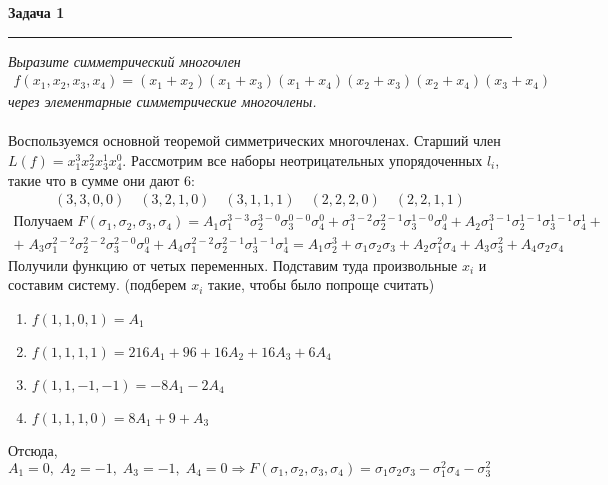 \documentclass[a4paper,11pt]{article}
\begin{document}
\textbf{\large Задача 1}
\medskip\hrule\medskip
\textit{Выразите симметрический многочлен}
\begin{gather*}
f(x_1, x_2, x_3, x_4) = (x_1 + x_2)(x_1 + x_3)(x_1 + x_4)(x_2 + x_3)(x_2 + x_4)(x_3 + x_4)
\end{gather*}
\textit{через элементарные симметрические многочлены.} \\ \\
Воспользуемся основной теоремой  симметрических многочленах. Старший член $ L(f) = x_1^3 x_2^2x_3^1x_4^0 $. Рассмотрим все наборы неотрицательных упорядоченных $ l_i $, такие что в сумме они дают $ 6 $: 
\begin{align*}
	(3, 3, 0, 0) \quad  
	(3, 2, 1, 0) \quad
	(3, 1, 1, 1) \quad
	(2, 2, 2, 0) \quad
	(2, 2, 1, 1)
\end{align*}
\begin{gather*}
\text{Получаем } F(\sigma_1, \sigma_2, \sigma_3, \sigma_4) = 
A_1 \sigma_1^{3 - 3}\sigma_2^{3 - 0}\sigma_3^{0 - 0}\sigma_4^{0} + 
\sigma_1^{3 - 2}\sigma_2^{2 - 1}\sigma_3^{1 - 0}\sigma_4^{0} + 
A_2 \sigma_1^{3 - 1}\sigma_2^{1 - 1}\sigma_3^{1 - 1}\sigma_4^{1} + \\[2pt] +
\; A_3 \sigma_1^{2 - 2}\sigma_2^{2 - 2}\sigma_3^{2 - 0}\sigma_4^{0} + 
A_4 \sigma_1^{2 - 2}\sigma_2^{2 - 1}\sigma_3^{1 - 1}\sigma_4^{1} = 
A_1\sigma_2^3 + \sigma_1\sigma_2\sigma_3 + A_2 \sigma_1^2\sigma_4 + A_3 \sigma_3^2 + A_4\sigma_2\sigma_4
\end{gather*}
Получили функцию от четых переменных. Подставим туда произвольные $ x_i $ и составим систему. (подберем $ x_i $ такие, чтобы было попроще считать)
\begin{enumerate}
\item $ f(1, 1, 0, 1) = A_1 $
\item $ f(1, 1, 1, 1) = 216A_1 + 96 + 16A_2 + 16A_3 + 6A_4 $
\item $ f(1, 1, -1, -1) = -8A_1 - 2A_4 $
\item $ f(1, 1, 1, 0) = 8A_1 + 9 + A_3 $
\end{enumerate}
Отсюда, $ A_1 = 0, \; A_2 = -1, \; A_3 = -1, \; A_4 = 0 \Rightarrow  F(\sigma_1, \sigma_2, \sigma_3, \sigma_4) = \sigma_1\sigma_2\sigma_3 - \sigma_1^2\sigma_4 - \sigma_3^2 $ \\ \\ \\





\end{document}
